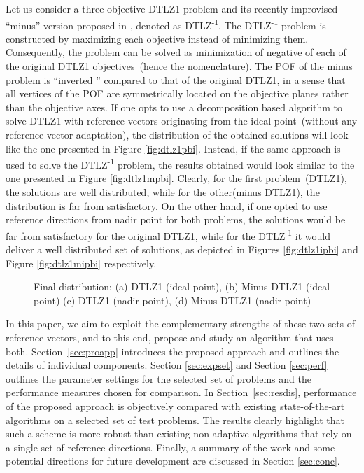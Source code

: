 \documentclass{sig-alternate}
\begin{document}
Let us consider a three objective DTLZ1 \cite{deb2005scalable} problem and its recently improvised ``minus'' version proposed in \cite{ishibuchi2016inverse}, denoted as DTLZ\textsuperscript{-1}. The DTLZ\textsuperscript{-1} problem is constructed by maximizing each objective instead of minimizing them. Consequently, the problem can be solved as minimization of negative of each of the original DTLZ1 objectives~(hence the nomenclature). The POF of the minus problem is ``inverted '' compared to that of the original DTLZ1, in a sense that all vertices of the POF are symmetrically located on the objective planes rather than the objective axes. If one opts to use a decomposition based algorithm to solve DTLZ1 with reference vectors originating from the ideal point~(without any reference vector adaptation), the distribution of the obtained solutions will look like the one presented in Figure \ref{fig:dtlz1pbi}. Instead, if the same approach is used to solve the DTLZ\textsuperscript{-1} problem, the results obtained would look similar to the one presented in Figure \ref{fig:dtlz1mpbi}. Clearly, for the first problem~(DTLZ1), the solutions are well distributed, while for the other(minus DTLZ1), the distribution is far from satisfactory. On the other hand, if one opted to use reference directions from nadir point for both problems, the solutions would be far from satisfactory for the original DTLZ1, while for the DTLZ\textsuperscript{-1} it would deliver a well distributed set of solutions, as depicted in Figures \ref{fig:dtlz1ipbi} and Figure \ref{fig:dtlz1mipbi} respectively.

\begin{figure}[!htb]
\centering
{}
\label{fig:rationale}
\caption{Final distribution: (a) DTLZ1 (ideal point), (b) Minus DTLZ1 (ideal point) (c) DTLZ1 (nadir point),  (d) Minus DTLZ1 (nadir point)}
\end{figure}

In this paper, we aim to exploit the complementary strengths of these two sets of reference vectors, and to this end, propose and study an algorithm that uses both. Section~\ref{sec:proapp} introduces the proposed approach and outlines the details of individual components. Section \ref{sec:expset} and Section \ref{sec:perf} outlines the parameter settings for the selected set of problems and the performance measures chosen for comparison. In Section~\ref{sec:resdis}, performance of the proposed approach is objectively compared with existing state-of-the-art algorithms on a selected set of test problems. The results clearly highlight that such a scheme is more robust than existing non-adaptive algorithms that rely on a single set of reference directions. Finally, a summary of the work and some potential directions for future development are discussed in Section \ref{sec:conc}.
\end{document}
